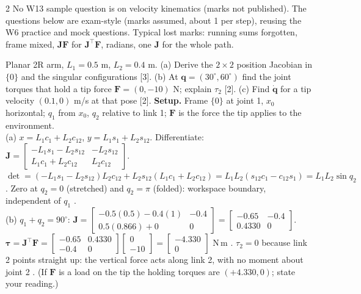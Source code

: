 \begin{multicols}{2}
No W13 sample question is on velocity kinematics (marks not published). The questions below are exam-style (marks assumed, about 1 per step), reusing the W6 practice and mock questions. Typical lost marks: running sums forgotten, frame mixed, $\mathbf J\mathbf F$ for $\mathbf J^\top\mathbf F$, radians, one $\mathbf J$ for the whole path.
\begin{examq}
Planar 2R arm, $L_1=0.5$ m, $L_2=0.4$ m. (a) Derive the $2\times2$ position Jacobian in $\{0\}$ and the singular configurations [3]. (b) At $\mathbf q=(30^\circ,60^\circ)$ find the joint torques that hold a tip force $\mathbf F=(0,-10)$ N; explain $\tau_2$ [2]. (c) Find $\dot{\mathbf q}$ for a tip velocity $(0.1,0)$ m/s at that pose [2].
\solution
\textbf{Setup.} Frame $\{0\}$ at joint 1, $x_0$ horizontal; $q_1$ from $x_0$, $q_2$ relative to link 1; $\mathbf F$ is the force the tip applies to the environment.\\
(a) $x=L_1c_1+L_2c_{12}$, $y=L_1s_1+L_2s_{12}$. Differentiate: $\mathbf J=\begin{bmatrix}-L_1s_1-L_2s_{12}&-L_2s_{12}\\L_1c_1+L_2c_{12}&L_2c_{12}\end{bmatrix}$. $\det=(-L_1s_1-L_2s_{12})L_2c_{12}+L_2s_{12}(L_1c_1+L_2c_{12})=L_1L_2(s_{12}c_1-c_{12}s_1)=L_1L_2\sin q_2$. Zero at $q_2=0$ (stretched) and $q_2=\pi$ (folded): workspace boundary, independent of $q_1$ .\\
(b) $q_1+q_2=90^\circ$: $\mathbf J=\begin{bmatrix}-0.5(0.5)-0.4(1)&-0.4\\0.5(0.866)+0&0\end{bmatrix}=\begin{bmatrix}-0.65&-0.4\\0.4330&0\end{bmatrix}$. $\boldsymbol\tau=\mathbf J^\top\mathbf F=\begin{bmatrix}-0.65&0.4330\\-0.4&0\end{bmatrix}\begin{bmatrix}0\\-10\end{bmatrix}=\begin{bmatrix}-4.330\\0\end{bmatrix}$ N\,m . $\tau_2=0$ because link 2 points straight up: the vertical force acts along link 2, with no moment about joint 2 . (If $\mathbf F$ is a load on the tip the holding torques are $(+4.330,0)$; state your reading.)\\

\end{examq}
\end{multicols}
